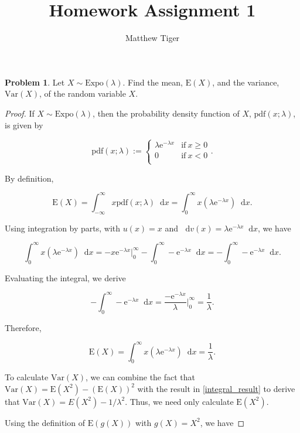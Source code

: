\documentclass[12pt]{article}
\title{Homework Assignment 1}
\author{Matthew Tiger}
\theoremstyle{definition}
\newtheorem{problem}{Problem}
\newcommand{\E}{\text{E}}
\newcommand{\V}{\text{Var}}
\newcommand{\pdf}{\text{pdf}}
\newcommand{\me}{\mathrm{e}}
\newcommand*\diff{\mathop{}\!\mathrm{d}}
\begin{document}
\maketitle


\begin{problem}
  Let $X \sim \text{Expo}(\lambda)$. Find the mean, $\E(X)$, and the
  variance, $\V(X)$, of the random variable $X$.
\end{problem}

\begin{proof}
  If $X \sim \text{Expo}(\lambda)$, then the probability density function of
  $X$, $\pdf(x; \lambda)$, is given by

  \[
    \pdf(x; \lambda) :=
      \begin{cases}
        \lambda \me^{-\lambda x} & \text{if}\ x \geq 0 \\
        0 & \text{if}\ x < 0 \\
      \end{cases}.
  \]

  By definition,

  \[
    \E(X) = \int_{-\infty}^{\infty} x \pdf(x; \lambda) \diff x = \int_{0}^{\infty} x \left( \lambda \me^{-\lambda x} \right) \diff x.
  \]

  Using integration by parts, with $u(x) = x$ and $\diff v(x) = \lambda \me^{-\lambda x} \diff x$, we have

  \[
    \int_{0}^{\infty} x \left( \lambda \me^{-\lambda x} \right) \diff x = -x \me^{-\lambda x}\Big|_{0}^{\infty} - \int_{0}^{\infty} -\me^{-\lambda x} \diff x = - \int_{0}^{\infty} -\me^{-\lambda x} \diff x.
  \]

  Evaluating the integral, we derive

  \[
    - \int_{0}^{\infty} -\me^{-\lambda x} \diff x = \frac{-\me^{-\lambda x}}{\lambda} \Big|_{0}^{\infty} = \frac{1}{\lambda}.
  \]

  Therefore,

  \begin{equation}\label{integral_result}
    \E(X) = \int_{0}^{\infty} x \left( \lambda \me^{-\lambda x} \right) \diff x = \frac{1}{\lambda}.
  \end{equation}

  To calculate $\V(X)$, we can combine the fact that $\V(X) = \E(X^2) - (\E(X))^2$
  with the result in \eqref{integral_result} to derive that
  $\V(X) = E(X^2) - 1/\lambda^2$. Thus, we need only calculate $\E(X^2)$.

  Using the definition of $\E(g(X))$ with $g(X) = X^2$, we have


\end{proof}
\end{document}
